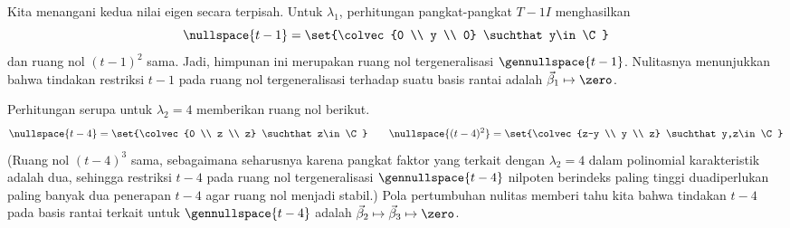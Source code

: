 \begin{exercises}
\begin{answer}
\begin{exparts}
            Kita menangani kedua nilai eigen secara terpisah.
            Untuk $\lambda_1$, perhitungan pangkat-pangkat $T-1I$
            menghasilkan
            \begin{equation*}
              \nullspace{t-1}=\set{\colvec{0 \\ y \\ 0}
                                      \suchthat y\in\C}
            \end{equation*}
            dan ruang nol $(t-1)^2$ sama.
            Jadi, himpunan ini merupakan ruang nol tergeneralisasi
            $\gennullspace{t-1}$.
            Nulitasnya menunjukkan bahwa tindakan restriksi $t-1$
            pada ruang nol tergeneralisasi terhadap suatu basis rantai
            adalah $\vec{\beta}_1\mapsto\zero$.

            Perhitungan serupa untuk $\lambda_2=4$ memberikan ruang nol berikut.
            \begin{equation*}
              \nullspace{t-4}=\set{\colvec{0 \\ z \\ z}
                                      \suchthat z\in\C}
              \qquad
              \nullspace{(t-4)^2}=\set{\colvec{z-y \\ y \\ z}
                                          \suchthat y,z\in\C}
            \end{equation*}
            (Ruang nol $(t-4)^3$ sama, sebagaimana seharusnya karena
            pangkat faktor yang terkait dengan $\lambda_2=4$ dalam
            polinomial karakteristik adalah dua, sehingga restriksi
            $t-4$ pada ruang nol tergeneralisasi $\gennullspace{t-4}$
            nilpoten berindeks paling tinggi dua\Dash diperlukan paling banyak
            dua penerapan $t-4$ agar ruang nol menjadi stabil.)
            Pola pertumbuhan nulitas memberi tahu kita bahwa
            tindakan $t-4$ pada basis rantai terkait
            untuk $\gennullspace{t-4}$ adalah
            $\vec{\beta}_2\mapsto\vec{\beta}_3\mapsto\zero$.


\end{exparts}
\end{answer}
\end{exercises}
